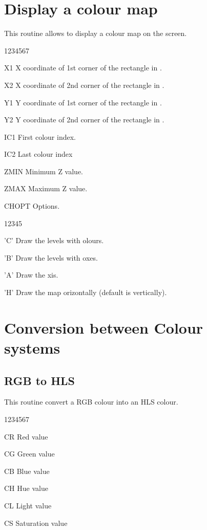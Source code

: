 \section{Display a colour map}
\Action
This routine allows to display a colour map on the screen.
\Pdesc
\begin{DLtt}{1234567}
\item[X1] X coordinate of 1st corner of the rectangle in \WC.
\item[X2] X coordinate of 2nd corner of the rectangle in \WC.
\item[Y1] Y coordinate of 1st corner of the rectangle in \WC.
\item[Y2] Y coordinate of 2nd corner of the rectangle in \WC.
\item[IC1] First colour index.
\item[IC2] Last colour index
\item[ZMIN] Minimum Z value.
\item[ZMAX] Maximum Z value.
\item[CHOPT] Options.
\begin{DLtt}{12345}
\item['C'] Draw the levels with olours.
\item['B'] Draw the levels with oxes.
\item['A'] Draw the xis.
\item['H'] Draw the map orizontally (default is vertically).
\end{DLtt}
\end{DLtt}

\newpage

\section{Conversion between Colour systems}

\subsection{RGB to HLS}
\Action
This routine convert a RGB colour into an HLS colour.
\Pdesc
\begin{DLtt}{1234567}
\item[CR] Red value 
\item[CG] Green value 
\item[CB] Blue value 
\item[CH] Hue value 
\item[CL] Light value 
\item[CS] Saturation value 
\end{DLtt}

